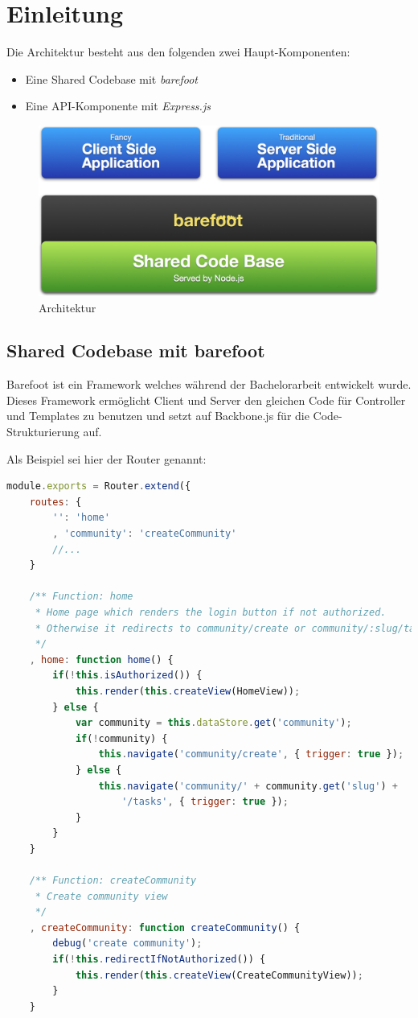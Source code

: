 \section{Einleitung}

Die Architektur besteht aus den folgenden zwei Haupt-Komponenten:
\begin{itemize}
	\item Eine Shared Codebase mit \emph{barefoot} \cite{Barefoot}
	\item Eine API-Komponente mit \emph{Express.js} \cite{Expressjs}
\end{itemize}

\begin{figure}[ht]
	\includegraphics[width=\textwidth]{content/images/architecture.png}
	\caption{Architektur}
\end{figure}

\subsection{Shared Codebase mit barefoot}
Barefoot \cite{Barefoot} ist ein Framework welches während der Bachelorarbeit entwickelt wurde.
Dieses Framework ermöglicht Client und Server den gleichen Code für Controller und Templates zu benutzen und setzt auf
Backbone.js \cite{Backbonejs} für die Code-Strukturierung auf.

Als Beispiel sei hier der Router genannt:
\begin{lstlisting}[language=JavaScript, caption=Router der Beispielapplikation, label=lst:roomiesRouter]
module.exports = Router.extend({
	routes: {
		'': 'home'
		, 'community': 'createCommunity'
		//...
	}

	/** Function: home
	 * Home page which renders the login button if not authorized.
	 * Otherwise it redirects to community/create or community/:slug/tasks.
	 */
	, home: function home() {
		if(!this.isAuthorized()) {
			this.render(this.createView(HomeView));
		} else {
			var community = this.dataStore.get('community');
			if(!community) {
				this.navigate('community/create', { trigger: true });
			} else {
				this.navigate('community/' + community.get('slug') +
					'/tasks', { trigger: true });
			}
		}
	}

	/** Function: createCommunity
	 * Create community view
	 */
	, createCommunity: function createCommunity() {
		debug('create community');
		if(!this.redirectIfNotAuthorized()) {
			this.render(this.createView(CreateCommunityView));
		}
	}
\end{lstlisting}

